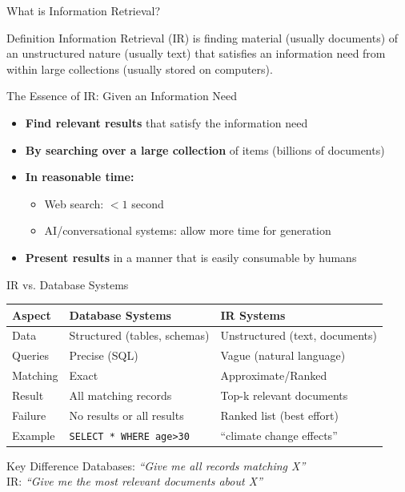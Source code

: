 \documentclass[aspectratio=169]{beamer}
\newif\ifanimated
\newcommand{\cpause}{\ifanimated\pause\fi}
\begin{document}
\begin{frame}{What is Information Retrieval?}
\begin{block}{Definition}
Information Retrieval (IR) is finding material (usually documents) of an unstructured nature (usually text) that satisfies an information need from within large collections (usually stored on computers).
\end{block}
\cpause
\vspace{1em}

\begin{exampleblock}{The Essence of IR: Given an Information Need}
\begin{itemize}
    \item \textbf{Find relevant results} that satisfy the information need
    \item \textbf{By searching over a large collection} of items (billions of documents)
    \item \textbf{In reasonable time:}
    \begin{itemize}
        \item Web search: $< 1$ second
        \item AI/conversational systems: allow more time for generation
    \end{itemize}
    \item \textbf{Present results} in a manner that is easily consumable by humans
\end{itemize}
\end{exampleblock}
\end{frame}


\begin{frame}{IR vs. Database Systems}
\begin{table}
\centering
\begin{tabular}{lll}
\toprule
\textbf{Aspect} & \textbf{Database Systems} & \textbf{IR Systems} \\
\midrule
Data & Structured (tables, schemas) & Unstructured (text, documents) \\
Queries & Precise (SQL) & Vague (natural language) \\
Matching & Exact & Approximate/Ranked \\
Result & All matching records & Top-k relevant documents \\
Failure & No results or all results & Ranked list (best effort) \\
\midrule
Example & \texttt{SELECT * WHERE age>30} & ``climate change effects'' \\
\bottomrule
\end{tabular}
\end{table}

\vspace{1em}
\cpause

\begin{alertblock}{Key Difference}
Databases: \textit{``Give me all records matching X''} \\
IR: \textit{``Give me the most relevant documents about X''}
\end{alertblock}
\end{frame}
\end{document}
